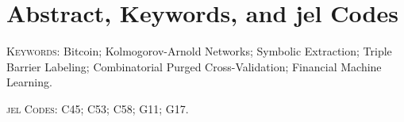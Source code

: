 \documentclass[12pt,a4paper,oneside]{article}
\begin{document}
\thispagestyle{empty}
\vspace*{\fill}
\begin{flushright}
\textit{%
}
\end{flushright}


\newpage
\thispagestyle{plain}

\setcounter{page}{1}

\glsaddall
\printglossaries


\newpage
\thispagestyle{plain}

\section*{Abstract, Keywords, and \gls{jel} Codes}


\vspace{1em}

\textsc{Keywords}: Bitcoin; Kolmogorov-Arnold Networks; Symbolic Extraction; Triple Barrier Labeling; Combinatorial Purged Cross-Validation; Financial Machine Learning.

\textsc{\gls{jel} Codes}: C45; C53; C58; G11; G17.


\newpage
\thispagestyle{plain}
\renewcommand*\contentsname{\hfill\normalfont\scshape\normalsize Table of Contents \hfill}
\tableofcontents

\newpage
\thispagestyle{plain}
\renewcommand*\listfigurename{\hfill\normalfont\scshape\normalsize List of Figures \hfill}
\listoffigures

\newpage
\thispagestyle{plain}
\renewcommand*\listtablename{\hfill\normalfont\scshape\normalsize List of Tables \hfill}
\listoftables
\end{document}
